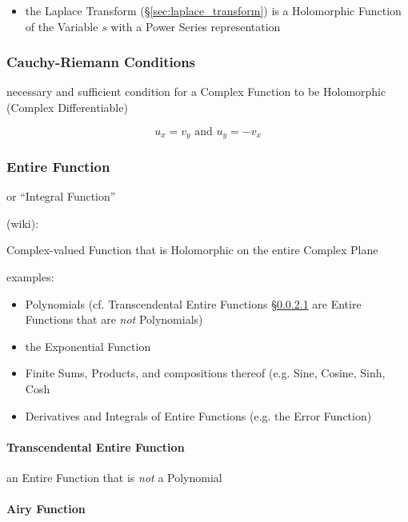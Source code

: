 \begin{itemize}
  \item the Laplace Transform (\S\ref{sec:laplace_transform}) is a Holomorphic
    Function of the Variable $s$ with a Power Series representation
\end{itemize}



\subsubsection{Cauchy-Riemann Conditions}\label{sec:cauchy_riemann}

necessary and sufficient condition for a Complex Function to be Holomorphic
(Complex Differentiable)

\[
  u_x = v_y \text{ and } u_y = - v_x
\]



\subsubsection{Entire Function}\label{sec:entire_function}

or ``Integral Function''

(wiki):

Complex-valued Function that is Holomorphic on the entire Complex Plane

examples:
\begin{itemize}
  \item Polynomials (cf. Transcendental Entire Functions
    \S\ref{sec:transcendental_entire} are Entire Functions that are \emph{not}
    Polynomials)
  \item the Exponential Function
  \item Finite Sums, Products, and compositions thereof (e.g. Sine, Cosine,
    Sinh, Cosh
  \item Derivatives and Integrals of Entire Functions (e.g. the Error Function)
\end{itemize}



\paragraph{Transcendental Entire Function}
\label{sec:transcendental_entire}\hfill

an Entire Function that is \emph{not} a Polynomial



\paragraph{Airy Function}\label{sec:airy_function}\hfill

